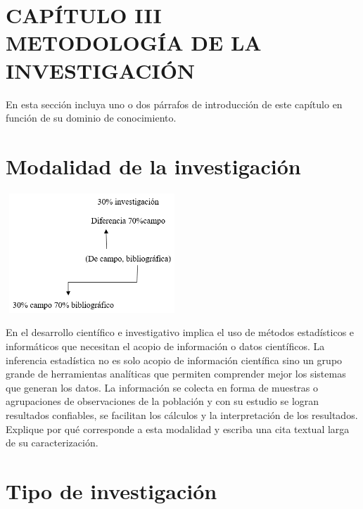 \documentclass[12pt, a4paper, nofontenc, numbers=endperiod]{apa7}
\begin{document}
{
\setlength\headsep{2.95cm}
\addtolength{\textheight}{-2.45cm}
\section*{\large \centering CAPÍTULO III \\ METODOLOGÍA DE LA INVESTIGACIÓN}
		
\setlength{\parindent}{1.27cm}En esta sección incluya uno o dos párrafos de introducción de este capítulo en función de su dominio de conocimiento.
	
		\section{\normalsize \centering Modalidad de la investigación}
\begin{center}
	\includegraphics[width=6.5cm,height=4.5cm]{Imagenes/Figura38}
\end{center}

\setlength{\parindent}{1.27cm}En el desarrollo científico e investigativo implica el uso de métodos estadísticos e informáticos que necesitan el acopio de información o datos científicos.  La inferencia estadística no es solo acopio de información científica sino un grupo grande de herramientas analíticas que permiten comprender mejor los sistemas que generan los datos. La información se colecta en forma de muestras o agrupaciones de observaciones de la población y con su estudio se logran resultados confiables, se facilitan los cálculos y la interpretación de los resultados. Explique por qué corresponde a esta modalidad y escriba una cita textual larga de su caracterización.

\section{\normalsize \centering Tipo de investigación}

}
\end{document}

